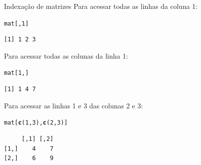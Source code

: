 \documentclass[10pt,handout]{beamer}\usepackage[]{graphicx}\usepackage[]{color}
\makeatletter
\newcommand{\hlnum}[1]{\textcolor[rgb]{0.686,0.059,0.569}{#1}}%
\newcommand{\hlstd}[1]{\textcolor[rgb]{0.345,0.345,0.345}{#1}}%
\newcommand{\hlkwd}[1]{\textcolor[rgb]{0.737,0.353,0.396}{\textbf{#1}}}%
\newenvironment{kframe}{%
 \def\at@end@of@kframe{}%
 \ifinner\ifhmode%
  \def\at@end@of@kframe{\end{minipage}}%
  \begin{minipage}{\columnwidth}%
 \fi\fi%
 \def\FrameCommand##1{\hskip\@totalleftmargin \hskip-\fboxsep
 \colorbox{shadecolor}{##1}\hskip-\fboxsep
     \hskip-\linewidth \hskip-\@totalleftmargin \hskip\columnwidth}%
 \MakeFramed {\advance\hsize-\width
   \@totalleftmargin\z@ \linewidth\hsize
   \@setminipage}}%
 {\par\unskip\endMakeFramed%
 \at@end@of@kframe}
\newenvironment{knitrout}{}{} %
\makeatother
\begin{document}
\begin{frame}[fragile]{Indexação de matrizes}
Para acessar todas as linhas da coluna 1:
\begin{knitrout}\small
{}\color{fgcolor}\begin{kframe}
\begin{alltt}
\hlstd{mat[,}\hlnum{1}\hlstd{]}
\end{alltt}
\begin{verbatim}
[1] 1 2 3
\end{verbatim}
\end{kframe}
\end{knitrout}
Para acessar todas as colunas da linha 1:
\begin{knitrout}\small
{}\color{fgcolor}\begin{kframe}
\begin{alltt}
\hlstd{mat[}\hlnum{1}\hlstd{,]}
\end{alltt}
\begin{verbatim}
[1] 1 4 7
\end{verbatim}
\end{kframe}
\end{knitrout}
Para acessar as linhas 1 e 3 das colunas 2 e 3:
\begin{knitrout}\small
{}\color{fgcolor}\begin{kframe}
\begin{alltt}
\hlstd{mat[}\hlkwd{c}\hlstd{(}\hlnum{1}\hlstd{,}\hlnum{3}\hlstd{),} \hlkwd{c}\hlstd{(}\hlnum{2}\hlstd{,}\hlnum{3}\hlstd{)]}
\end{alltt}
\begin{verbatim}
     [,1] [,2]
[1,]    4    7
[2,]    6    9
\end{verbatim}
\end{kframe}
\end{knitrout}
\end{frame}
\end{document}
